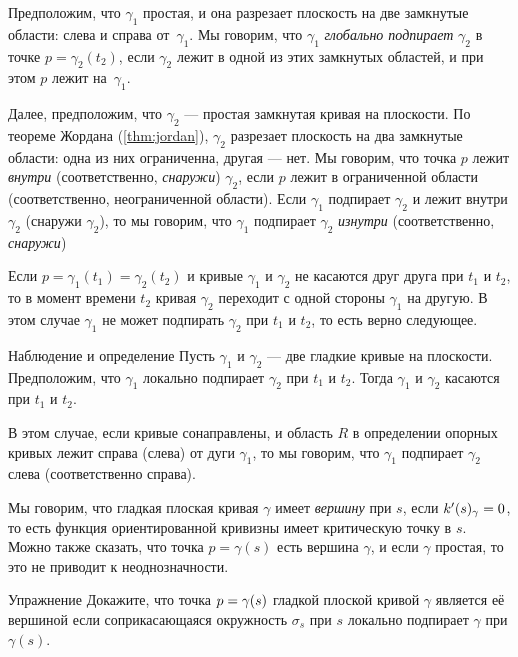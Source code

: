 Предположим, что $\gamma_1$ простая, и она разрезает плоскость на две замкнутые области: слева и справа от~$\gamma_1$.
Мы говорим, что $\gamma_1$ \emph{глобально подпирает} $\gamma_2$ в точке $p=\gamma_2(t_2)$, 
если $\gamma_2$ лежит в одной из этих замкнутых областей, и при этом $p$ лежит на~$\gamma_1$.

Далее, предположим, что $\gamma_2$ --- простая замкнутая кривая на плоскости.
По теореме Жордана (\ref{thm:jordan}), $\gamma_2$ разрезает плоскость на два замкнутые области: одна из них ограниченна, другая --- нет.
Мы говорим, что точка $p$ лежит {}\emph{внутри} (соответственно, {}\emph{снаружи}) $\gamma_2$, если $p$ лежит в ограниченной области (соответственно, неограниченной области).
Если $\gamma_1$ подпирает $\gamma_2$ и лежит внутри $\gamma_2$ (снаружи $\gamma_2$), то мы говорим, что $\gamma_1$ подпирает $\gamma_2$ \emph{изнутри} (соответственно, {}\emph{снаружи})


Если $p=\gamma_1(t_1)=\gamma_2(t_2)$ и кривые $\gamma_1$ и $\gamma_2$ не касаются друг друга при $t_1$ и $t_2$, то в момент времени $t_2$ кривая $\gamma_2$ переходит с одной стороны $\gamma_1$ на другую.
В этом случае $\gamma_1$ не может подпирать $\gamma_2$ при $t_1$ и $t_2$, то есть верно следующее.

\begin{thm}{Наблюдение и определение}
Пусть $\gamma_1$ и $\gamma_2$ --- две гладкие кривые на плоскости.
Предположим, что $\gamma_1$ локально подпирает $\gamma_2$ при $t_1$ и $t_2$.
Тогда $\gamma_1$ и $\gamma_2$ касаются при $t_1$ и $t_2$.

В этом случае, если кривые сонаправлены, и область $R$ в определении опорных кривых лежит справа (слева) от дуги $\gamma_1$, то мы говорим, что 
$\gamma_1$ подпирает $\gamma_2$ слева (соответственно справа).
\end{thm}

Мы говорим, что гладкая плоская кривая $\gamma$ имеет \emph{вершину} при $s$, 
если $k'(s)_\gamma=0$, то есть функция ориентированной кривизны имеет критическую точку в $s$.
Можно также сказать, что точка $p=\gamma(s)$ есть вершина $\gamma$,
и если $\gamma$ простая, то это не приводит к неоднозначности.

\begin{thm}{Упражнение}\label{ex:vertex-support}
Докажите, что точка $p\z=\gamma(s)$ гладкой плоской кривой $\gamma$ является её вершиной если
соприкасающаяся окружность $\sigma_s$ при $s$ локально подпирает $\gamma$ при $\gamma(s)$.
\end{thm}

